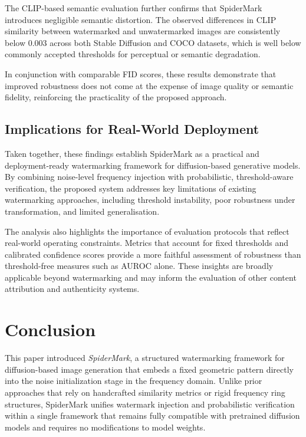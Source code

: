 \documentclass[lettersize,journal,review]{IEEEtran}
\begin{document}
The CLIP-based semantic evaluation further confirms that SpiderMark introduces negligible semantic distortion. The observed differences in CLIP similarity between watermarked and unwatermarked images are consistently below 0.003 across both Stable Diffusion and COCO datasets, which is well below commonly accepted thresholds for perceptual or semantic degradation.

In conjunction with comparable FID scores, these results demonstrate that improved robustness does not come at the expense of image quality or semantic fidelity, reinforcing the practicality of the proposed approach.

\subsection{Implications for Real-World Deployment}

Taken together, these findings establish SpiderMark as a practical and deployment-ready watermarking framework for diffusion-based generative models. By combining noise-level frequency injection with probabilistic, threshold-aware verification, the proposed system addresses key limitations of existing watermarking approaches, including threshold instability, poor robustness under transformation, and limited generalisation.

The analysis also highlights the importance of evaluation protocols that reflect real-world operating constraints. Metrics that account for fixed thresholds and calibrated confidence scores provide a more faithful assessment of robustness than threshold-free measures such as AUROC alone. These insights are broadly applicable beyond watermarking and may inform the evaluation of other content attribution and authenticity systems.

\section{Conclusion}

This paper introduced \textit{SpiderMark}, a structured watermarking framework for diffusion-based image generation that embeds a fixed geometric pattern directly into the noise initialization stage in the frequency domain. Unlike prior approaches that rely on handcrafted similarity metrics or rigid frequency ring structures, SpiderMark unifies watermark injection and probabilistic verification within a single framework that remains fully compatible with pretrained diffusion models and requires no modifications to model weights.
\end{document}
